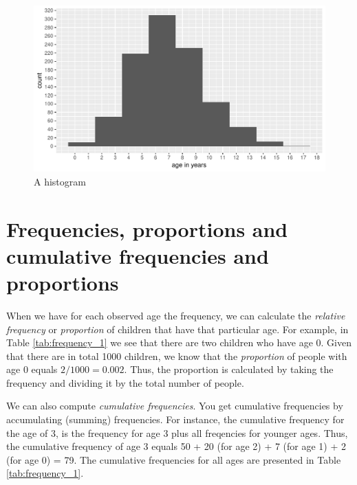 \documentclass[]{report}\usepackage[]{graphicx}\usepackage[]{color}
\makeatletter
\def\maxwidth{ %
  \ifdim\Gin@nat@width>\linewidth
    \linewidth
  \else
    \Gin@nat@width
  \fi
}
\newenvironment{knitrout}{}{} %
\makeatother
\begin{document}
\begin{knitrout}
\color{fgcolor}\begin{figure}

{\centering \includegraphics[width=\maxwidth]{figure/distr_2-1} 

}

\caption[A histogram]{A histogram}\label{fig:distr_2}
\end{figure}


\end{knitrout}



\section{Frequencies, proportions and cumulative frequencies and proportions}


When we have for each observed age the frequency, we can calculate the \textit{relative frequency} or \textit{proportion} of children that have that particular age. For example, in Table \ref{tab:frequency_1} we see that there are two children who have age 0. Given that there are in total 1000 children, we know that the \textit{proportion} of people with age 0 equals $2/1000=0.002$. Thus, the proportion is calculated by taking the frequency and dividing it by the total number of people.


We can also compute \textit{cumulative frequencies}. You get cumulative frequencies by accumulating (summing) frequencies. For instance, the cumulative frequency for the age of 3, is the frequency for age 3 plus all freqencies for younger ages. Thus, the cumulative frequency of age 3 equals 50 + 20 (for age 2) + 7 (for age 1) + 2 (for age 0) = 79. The cumulative frequencies for all ages are presented in Table \ref{tab:frequency_1}.
\end{document}
